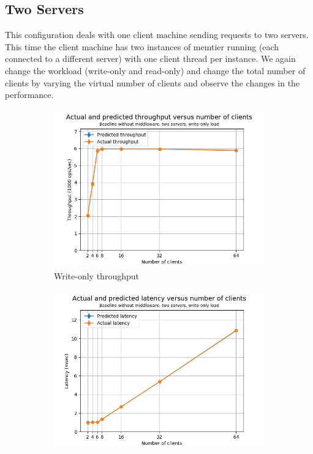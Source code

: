 \documentclass[11pt,a4paper]{article}
\begin{document}
\subsection{Two Servers} \label{sec:csb2}
This configuration deals with one client machine sending requests to two servers. This time the client machine has two instances of memtier running (each connected to a different server) with one client thread per instance. We again change the workload (write-only and read-only) and change the total number of clients by varying the virtual number of clients and observe the changes in the performance.

\begin{figure}[h]
\centering
\begin{subfigure}{.5\textwidth}
  \centering
  \includegraphics[width=1.0\linewidth,trim={0px 0px 0px 0px},clip]{img/plot/csb2-wo-law_tpt.png}
  \caption{Write-only throughput}
  \label{fig:csb2-wo-law_tpt}
\end{subfigure}%
\begin{subfigure}{.5\textwidth}
  \centering
  \includegraphics[width=1.0\linewidth,trim={0px 0px 0px 0px},clip]{img/plot/csb2-wo-law_lat.png}

\end{subfigure}
\end{figure}
\end{document}
